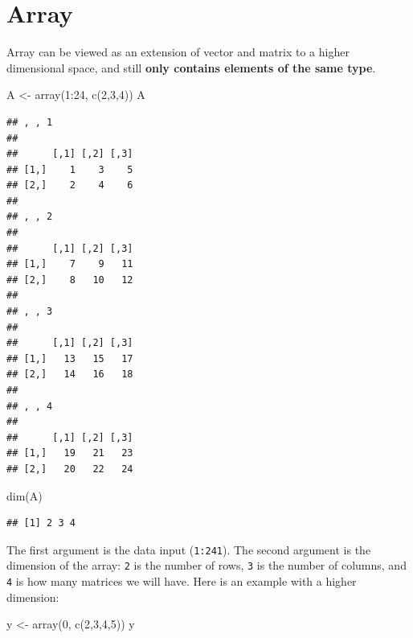 \documentclass[
]{book}
\newenvironment{Shaded}{\begin{snugshade}}{\end{snugshade}}
\newcommand{\DecValTok}[1]{\textcolor[rgb]{0.00,0.00,0.81}{#1}}
\newcommand{\FunctionTok}[1]{\textcolor[rgb]{0.00,0.00,0.00}{#1}}
\newcommand{\NormalTok}[1]{#1}
\newcommand{\OtherTok}[1]{\textcolor[rgb]{0.56,0.35,0.01}{#1}}
\newcommand{\SpecialCharTok}[1]{\textcolor[rgb]{0.00,0.00,0.00}{#1}}
\begin{document}
\hypertarget{array}{%
\section{Array}\label{array}}

Array can be viewed as an extension of vector and matrix to a higher dimensional space, and still \textbf{only contains elements of the same type}.

\begin{Shaded}
\begin{Highlighting}[]
\NormalTok{A }\OtherTok{\textless{}{-}} \FunctionTok{array}\NormalTok{(}\DecValTok{1}\SpecialCharTok{:}\DecValTok{24}\NormalTok{, }\FunctionTok{c}\NormalTok{(}\DecValTok{2}\NormalTok{,}\DecValTok{3}\NormalTok{,}\DecValTok{4}\NormalTok{))}
\NormalTok{A}
\end{Highlighting}
\end{Shaded}

\begin{verbatim}
## , , 1
## 
##      [,1] [,2] [,3]
## [1,]    1    3    5
## [2,]    2    4    6
## 
## , , 2
## 
##      [,1] [,2] [,3]
## [1,]    7    9   11
## [2,]    8   10   12
## 
## , , 3
## 
##      [,1] [,2] [,3]
## [1,]   13   15   17
## [2,]   14   16   18
## 
## , , 4
## 
##      [,1] [,2] [,3]
## [1,]   19   21   23
## [2,]   20   22   24
\end{verbatim}

\begin{Shaded}
\begin{Highlighting}[]
\FunctionTok{dim}\NormalTok{(A)}
\end{Highlighting}
\end{Shaded}

\begin{verbatim}
## [1] 2 3 4
\end{verbatim}

The first argument is the data input (\texttt{1:241}). The second argument is the dimension of the array: \texttt{2} is the number of rows, \texttt{3} is the number of columns, and \texttt{4} is how many matrices we will have. Here is an example with a higher dimension:

\begin{Shaded}
\begin{Highlighting}[]
\NormalTok{y }\OtherTok{\textless{}{-}} \FunctionTok{array}\NormalTok{(}\DecValTok{0}\NormalTok{, }\FunctionTok{c}\NormalTok{(}\DecValTok{2}\NormalTok{,}\DecValTok{3}\NormalTok{,}\DecValTok{4}\NormalTok{,}\DecValTok{5}\NormalTok{))}
\NormalTok{y}
\end{Highlighting}
\end{Shaded}
\end{document}
